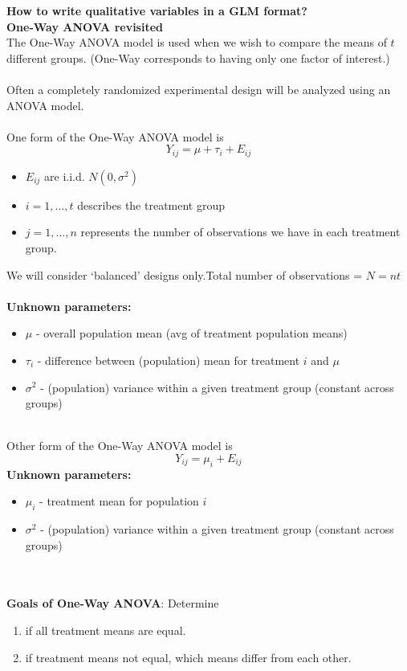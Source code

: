 \Large\textbf{How to write qualitative variables in a GLM format?}\large\\
\textbf{One-Way ANOVA revisited}\label{ANOVAreview}\\
The One-Way ANOVA model is used when we wish to compare the means of $t$ different groups.  (One-Way corresponds to having only one factor of interest.)\\~\\
Often a completely randomized experimental design will be analyzed using an ANOVA model.  \\~\\
One form of the One-Way ANOVA model is
$$Y_{ij}=\mu+\tau_i+E_{ij}$$
\begin{itemize}
\item $E_{ij}$ are i.i.d. $N(0,\sigma^2)$\
\item $i=1,...,t$ describes the treatment group
\item $j=1,...,n$ represents the number of observations we have in each treatment group.
\end{itemize}
We will consider `balanced' designs only.Total number of observations = $N = nt$\\~\\
\textbf{Unknown parameters:}
\begin{itemize}
\item $\mu$ - overall population mean (avg of treatment population means)
\item $\tau_i$ - difference between (population) mean for treatment $i$ and $\mu$
\item $\sigma^2$ - (population) variance within a given treatment group (constant across groups)
\end{itemize}
~\\
Other form of the One-Way ANOVA model is
$$Y_{ij}=\mu_i+E_{ij}$$
\textbf{Unknown parameters:}
\begin{itemize}
\item $\mu_i$ - treatment mean for population $i$
\item $\sigma^2$ - (population) variance within a given treatment group (constant across groups)
\end{itemize}
~\\~\\
\textbf{Goals of One-Way ANOVA}: Determine
\begin{enumerate}
\item if all treatment means are equal.
\item if treatment means not equal, which means differ from each other.
\end{enumerate}

